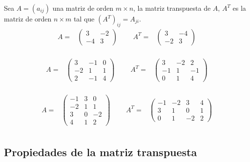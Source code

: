 \documentclass[
]{article}
\begin{document}
\small

Sea \(A=(a_{ij})\) una matriz de orden \(m\times n\), la matriz
transpuesta de \(A\), \(A^{T}\) es la matriz de orden \(n\times m\) tal
que \((A^T)_{ij}=A_{ji}\). \begin{equation*}
\begin{array}{ccccc}
A = & \begin{pmatrix} 3 & -2  \\ -4 & 3 \end{pmatrix} &\,\,\,\, & A^{T} = & \begin{pmatrix} 3 & -4  \\ -2 & 3 \end{pmatrix}  \\
\end{array}
\end{equation*}

\begin{equation*}
\begin{array}{ccccc}
A = & \begin{pmatrix} 3 & -1 & 0 \\ -2 & 1 & 1 \\ 2 & -1 & 4 \end{pmatrix} &\,\,\,\, & A^{T} = & \begin{pmatrix}  3 & -2 & 2 \\ -1 & 1 & -1 \\ 0 & 1 & 4  \end{pmatrix}  \\
\end{array}
\end{equation*}

\begin{equation*}
\begin{array}{ccccc}
A = & \begin{pmatrix} -1 & 3 & 0 \\ -2 & 1 & 1 \\ 3 & 0 & -2 \\ 4 & 1 & 2 \end{pmatrix} &\,\,\,\, & A^{T} = & \begin{pmatrix}  -1 & -2 & 3 & 4 \\ 3 & 1 & 0 &  1 \\ 0 & 1 & -2 & 2  \end{pmatrix}  \\
\end{array}
\end{equation*}

\hypertarget{propiedades-de-la-matriz-transpuesta}{%
\subsection{Propiedades de la matriz
transpuesta}\label{propiedades-de-la-matriz-transpuesta}}
\end{document}
